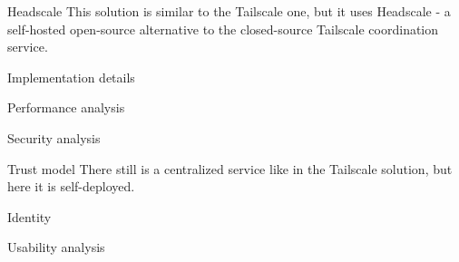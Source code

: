 \begin{frame}{Headscale}
\protect\hypertarget{headscale}{}
This solution is similar to the Tailscale one, but it uses Headscale - a
self-hosted open-source alternative to the closed-source Tailscale
coordination service.

\begin{block}{Implementation details}
\protect\hypertarget{implementation-details}{}
\end{block}

\begin{block}{Performance analysis}
\protect\hypertarget{performance-analysis}{}
\end{block}

\begin{block}{Security analysis}
\protect\hypertarget{security-analysis}{}
\begin{block}{Trust model}
\protect\hypertarget{trust-model}{}
There still is a centralized service like in the Tailscale solution, but
here it is self-deployed.
\end{block}

\begin{block}{Identity}
\protect\hypertarget{identity}{}
\end{block}
\end{block}

\begin{block}{Usability analysis}
\protect\hypertarget{usability-analysis}{}
\end{block}
\end{frame}
